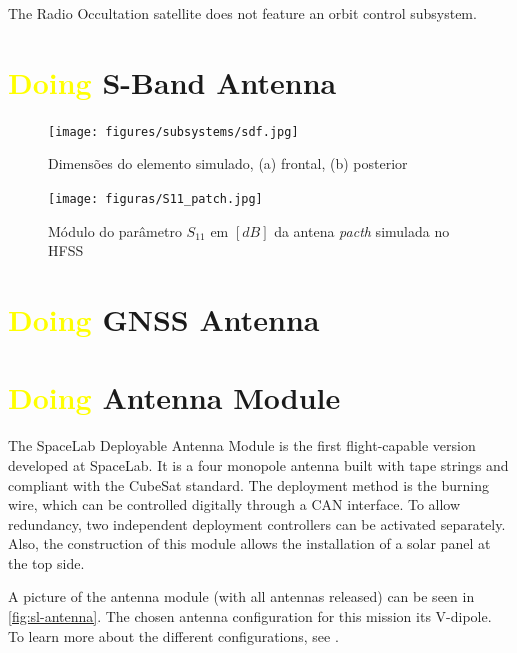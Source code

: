 The Radio Occultation satellite does not feature an orbit control subsystem.


\section{ \textcolor{yellow}{Doing} S-Band Antenna}

        \begin{figure}[!t]
        \caption{\label{patch_sim} Dimensões do elemento simulado, (a) frontal, (b) posterior}
	    \centering
	    \texttt{[image: figures/subsystems/sdf.jpg]}
        
        \end{figure}
        \begin{figure}[!b]
        \caption{\label{S11_patch} Módulo do parâmetro $S_{11}$ em $[dB]$ da antena \textit{pacth} simulada no HFSS}
	    \centering
	    \texttt{[image: figuras/S11\_patch.jpg]}
        
        \end{figure}

\section{ \textcolor{yellow}{Doing} GNSS Antenna}

\section{ \textcolor{yellow}{Doing} Antenna Module}

The SpaceLab Deployable Antenna Module is the first flight-capable version developed at SpaceLab. It is a four monopole antenna built with tape strings and compliant with the CubeSat standard. The deployment method is the burning wire, which can be controlled digitally through a CAN interface. To allow redundancy, two independent deployment controllers can be activated separately. Also, the construction of this module allows the installation of a solar panel at the top side.

A picture of the antenna module (with all antennas released) can be seen in \autoref{fig:sl-antenna}. The chosen antenna configuration for this mission its V-dipole. To learn more about the different configurations, see \cite{ant-rad}.

